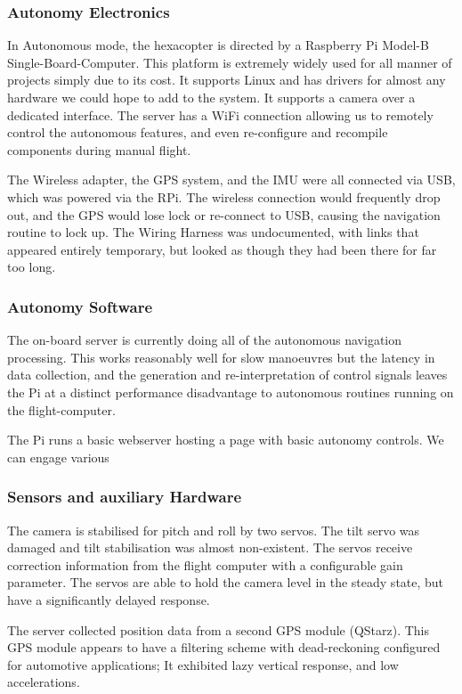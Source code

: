 \documentclass[a4paper, 11pt, titlepage]{article}
\begin{document}
    \subsubsection{Autonomy Electronics}
      In Autonomous mode, the hexacopter is directed by a Raspberry Pi Model-B Single-Board-Computer.
      This platform is extremely widely used for all manner of projects simply due to its cost.
      It supports Linux and has drivers for almost any hardware we could hope to add to the system. It supports a camera over a dedicated interface.
      The server has a WiFi connection allowing us to remotely control the autonomous features, and even re-configure and recompile components during manual flight.

      The Wireless adapter, the GPS system, and the IMU were all connected via USB, which was powered via the RPi.  The wireless connection would frequently drop out, and the GPS would lose lock or re-connect to USB, causing the navigation routine to lock up.
      The Wiring Harness was undocumented, with links that appeared entirely temporary, but looked as though they had been there for far too long.

    \subsubsection{Autonomy Software}
      The on-board server is currently doing all of the autonomous navigation processing.  This works reasonably well for slow manoeuvres but the latency in data collection, and the generation and re-interpretation of control signals leaves the Pi at a distinct performance disadvantage to autonomous routines running on the flight-computer.

      The Pi runs a basic webserver hosting a page with basic autonomy controls. We can engage various

    \subsubsection{Sensors and auxiliary Hardware}
      The camera is stabilised for pitch and roll by two servos. The tilt servo was damaged and tilt stabilisation was almost non-existent.  The servos receive correction information from the flight computer with a configurable gain parameter.  The servos are able to hold the camera level in the steady state, but have a significantly delayed response.

      The server collected position data from a second GPS module (QStarz).  This GPS module appears to have a filtering scheme with dead-reckoning configured for automotive applications; It exhibited lazy vertical response, and low accelerations.
\end{document}
